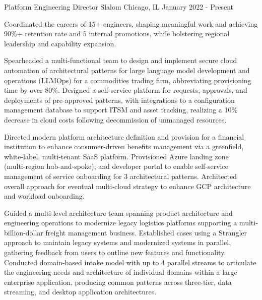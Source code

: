 

\begin{cventries}

  \cventry
    {Platform Engineering Director} %
    {Slalom} %
    {Chicago, IL} %
    {January 2022 - Present} %
    {
      \begin{cvitems} %
        \item {Coordinated the careers of 15+ engineers, shaping meaningful work and achieving 90\%+ retention rate and 5 internal promotions, while bolstering regional leadership and capability expansion.}
        \item {Spearheaded a multi-functional team to design and implement secure cloud automation of architectural patterns for large language model development and operations (LLMOps) for a commodities trading firm, abbreviating provisioning time by over 80\%. Designed a self-service platform for requests, approvals, and deployments of pre-approved patterns, with integrations to a configuration management database to support ITSM and asset tracking, realizing a 10\% decrease in cloud costs following decommission of unmanaged resources.}
        \item {Directed modern platform architecture definition and provision for a financial institution to enhance consumer‑driven benefits management via a greenfield, white‑label, multi‑tenant SaaS platform. Provisioned Azure landing zone (multi‑region hub‑and‑spoke), and developer portal to enable self‑service management of service onboarding for 3 architectural patterns. Architected overall approach for eventual multi‑cloud strategy to enhance GCP architecture and workload onboarding.}
        \item {Guided a multi-level architecture team spanning product architecture and engineering operations to modernize legacy logistics platforms supporting a multi-billion-dollar freight management business. Established cases using a Strangler approach to maintain legacy systems and modernized systems in parallel, gathering feedback from users to outline new features and functionality. Conducted domain-based intake model with up to 4 parallel streams to articulate the engineering needs and architecture of individual domains within a large enterprise application, producing common patterns across three-tier, data streaming, and desktop application architectures.}
      \end{cvitems}
    }


\end{cventries}
